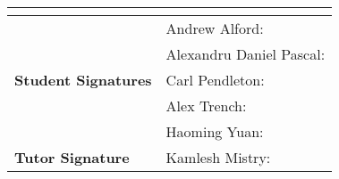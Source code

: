 \documentclass[11pt]{article}
\begin{document}
\begin{flushleft}
\begin{table}[]
\begin{tabular}{|l|l|}
\multicolumn{2}{|l|}{}                                                                                        \\ \hline
\multirow{5}{*}{\textbf{Student Signatures}}                    & Andrew Alford:                              \\ \cline{2-2} 
                                                                & Alexandru Daniel Pascal:                    \\ \cline{2-2} 
                                                                & Carl Pendleton:                             \\ \cline{2-2} 
                                                                & Alex Trench:                                \\ \cline{2-2} 
                                                                & Haoming Yuan:                               \\ \hline
\textbf{Tutor Signature}                                        & Kamlesh Mistry:                             \\ \hline
\end{tabular}
\end{table}

\end{flushleft}
\end{document}
